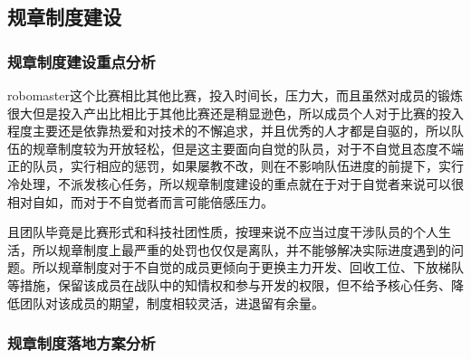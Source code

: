 \subsection{规章制度建设}

    \subsubsection{规章制度建设重点分析}

        robomaster这个比赛相比其他比赛，投入时间长，压力大，而且虽然对成员的锻炼很大但是投入产出比相比于其他比赛还是稍显逊色，所以成员个人对于比赛的投入程度主要还是依靠热爱和对技术的不懈追求，并且优秀的人才都是自驱的，所以队伍的规章制度较为开放轻松，但是这主要面向自觉的队员，对于不自觉且态度不端正的队员，实行相应的惩罚，如果屡教不改，则在不影响队伍进度的前提下，实行冷处理，不派发核心任务，所以规章制度建设的重点就在于对于自觉者来说可以很相对自如，而对于不自觉者而言可能倍感压力。\par
        且团队毕竟是比赛形式和科技社团性质，按理来说不应当过度干涉队员的个人生活，所以规章制度上最严重的处罚也仅仅是离队，并不能够解决实际进度遇到的问题。所以规章制度对于不自觉的成员更倾向于更换主力开发、回收工位、下放梯队等措施，保留该成员在战队中的知情权和参与开发的权限，但不给予核心任务、降低团队对该成员的期望，制度相较灵活，进退留有余量。\par

    \subsubsection{规章制度落地方案分析}


